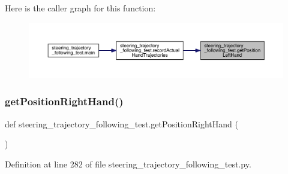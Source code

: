 Here is the caller graph for this function\+:\nopagebreak
\begin{figure}[H]
\begin{center}
\leavevmode
\includegraphics[width=350pt]{namespacesteering__trajectory__following__test_a0f76013b90d9b49c61ca4054512e5852_icgraph}
\end{center}
\end{figure}
\mbox{\label{namespacesteering__trajectory__following__test_a69336b47326639e5108afdb6eec04bfa}} 
\subsubsection{\texorpdfstring{getPositionRightHand()}{getPositionRightHand()}}
{\footnotesize\ttfamily def steering\+\_\+trajectory\+\_\+following\+\_\+test.\+get\+Position\+Right\+Hand (\begin{DoxyParamCaption}{ }\end{DoxyParamCaption})}



Definition at line 282 of file steering\+\_\+trajectory\+\_\+following\+\_\+test.\+py.


